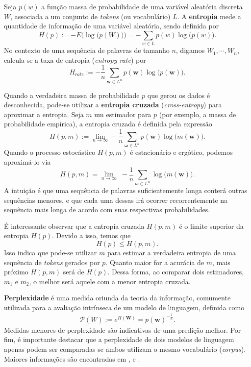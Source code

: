 \documentclass{automatextcc}
\newcommand{\Perp}{\mathcal{P}}
\newcommand{\bs}[1]{\boldsymbol{#1}}
\begin{document}
Seja $p(w)$ a função massa de probabilidade de uma variável aleatória discreta $W$, associada a um conjunto de \textit{tokens} (ou vocabulário) $L$. A \textbf{entropia} mede a quantidade de informação de uma variável aleatória, sendo definida por
\begin{equation*}
    H(p) := -E \big(\log \big( p(W)\big) \big) = - \sum_{w \in L} p(w) \log \big(p(w)\big). 
\end{equation*}
No contexto de uma sequência de palavras de tamanho $n$, digamos $W_1, \cdots, W_n$, calcula-se a taxa de entropia (\textit{entropy rate})  por
\begin{equation*}
    H_{rate} := - \frac{1}{n} \sum_{\bs{w} \in L^n} p(\bs{w}) \log \big(p(\bs{w})\big). 
\end{equation*}

Quando a verdadeira massa de probabilidade $p$ que gerou os dados é desconhecida, pode-se utilizar a \textbf{entropia cruzada} (\textit{cross-entropy}) para aproximar a entropia. Seja $m$ um estimador para $p$ (por exemplo, a massa de probabilidade empírica), a entropia cruzada é definida pela expressão
\begin{equation*}
    H(p,m) := \lim_{n \rightarrow \infty}  - \frac{1}{n} \sum_{\bs\omega \in L^n}  p(\bs{w}) \log\big(m(\bs{w})\big) .
\end{equation*}
Quando o processo estocástico $H(p,m)$ é estacionário e ergótico, podemos aproximá-lo via
\begin{equation*}
    H(p,m) = \lim_{n \rightarrow \infty} \; - \frac{1}{n} \sum_{\bs\omega \in L^n} \log\big(m(\bs{w})\big).
\end{equation*}
A intuição é que uma sequência de palavras suficientemente longa conterá outras sequências menores, e que cada uma dessas irá ocorrer recorrentemente na sequência mais longa de acordo com suas respectivas probabilidades.

É interessante observar que a entropia cruzada $H(p,m)$ é o limite superior da entropia $H(p)$. Devido a isso, temos que
\begin{equation*}
    H(p) \leq H(p,m).
\end{equation*}
Isso indica que pode-se utilizar $m$ para estimar a verdadeira entropia de uma sequência de \textit{tokens} gerados por $p$. Quanto maior for a acurácia de $m$, mais próximo $H(p,m)$ será de $H(p)$. Dessa forma, ao comparar dois estimadores, $m_1$ e $m_2$, o melhor será aquele com a menor entropia cruzada.

\textbf{Perplexidade} é uma medida oriunda da teoria da informação, comumente utilizada para a avaliação intrínseca de um modelo de linguagem, definida como
\begin{align*}
    \Perp (W) := e^{H(\bs{W})} = p(\bs{w})^{-\frac{1}{n}}.
\end{align*}
Medidas menores de perplexidade são indicativas de uma predição melhor. Por fim, é importante destacar que a perplexidade de dois modelos de linguagem apenas podem ser comparadas se ambos utilizam o mesmo vocabulário (\textit{corpus}). Maiores informações são encontradas em \citet{manning1999}, \citet{kamath2019} e \citet{jurafsky2021}.
\end{document}
